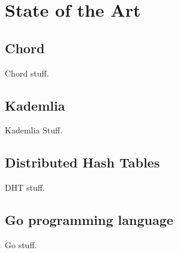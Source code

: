 \chapter{State of the Art}
\section{Chord}
Chord stuff.
\section{Kademlia}
Kademlia Stuff.
\section{Distributed Hash Tables}
DHT stuff.
\section{Go programming language}
Go stuff.
